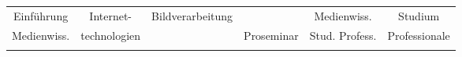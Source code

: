 \begin{table}[htbp]
{\begin{tabular}{cccccc}
			\multicolumn{1}{|c|}{Einführung}    & \multicolumn{1}{c|}{Internet-}     & \multicolumn{1}{c|}{Bildverarbeitung}  & \multicolumn{1}{c|}{}                 & \multicolumn{1}{c|}{Medienwiss.}       & \multicolumn{1}{c|}{Studium}          \\ \cline{4-5}
			\multicolumn{1}{|c|}{Medienwiss.}    & \multicolumn{1}{c|}{technologien}  & \multicolumn{1}{c|}{}                  & \multicolumn{1}{c|}{Proseminar}       & \multicolumn{1}{c|}{Stud. Profess.}    & \multicolumn{1}{c|}{Professionale}    \\ \hline
			                                     &                                    &                                        &                                       &                                        &                                       
		\end{tabular}}
\end{table}